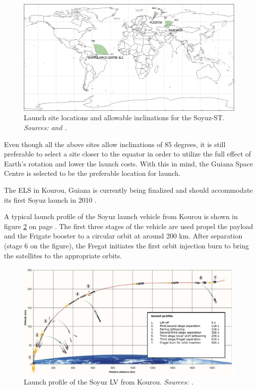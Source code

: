 \begin{figure}[!h]
\centering
\includegraphics[width=1.0\textwidth, angle=0]{chapters/img/launchsites.png}
\caption{Launch site locations and allowable inclinations for the Soyuz-ST. \emph{Sources: \cite{constDesign} and \cite{rockotman}.} }
\label{fig:launchsites}
\end{figure}

Even though all the above sites allow inclinations of 85 degrees, it is still preferable to select a site closer to the equator in order to utilize the full effect of Earth's rotation and lower the launch costs. With this in mind, the Guiana Space Centre is selected to be the preferable location for launch.

The \ac{ELS} in Kourou, Guiana is currently being finalized and should accommodate its first Soyuz launch in 2010 \cite{arianesoyuz}.

A typical launch profile of the Soyuz launch vehicle from Kourou is shown in figure \ref{fig:launch} on page \pageref{fig:launch}. The first three stages of the vehicle are used propel the payload and the Frigate booster to a circular orbit at around 200 km. After separation (stage 6 on the figure), the Fregat initiates the first orbit injection burn to bring the satellites to the appropriate orbits.

\begin{figure}[!h]
\centering
\includegraphics[width=1.0\textwidth, angle=0]{chapters/img/launchprofile.png}
\caption{Launch profile of the Soyuz LV from Kourou. \emph{Sources: \cite{soyuzman}.} }
\label{fig:launch}
\end{figure}

